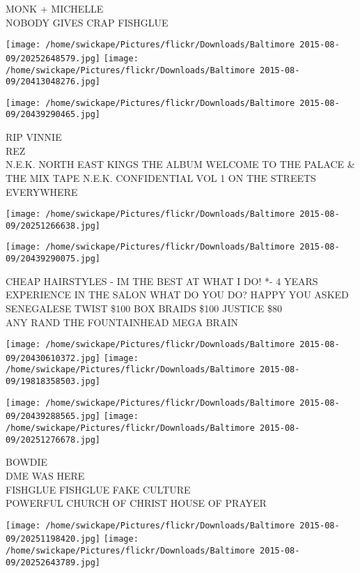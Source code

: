 \documentclass[10pt,letterpaper]{article}
\begin{document}
MONK + MICHELLE\\
NOBODY GIVES CRAP FISHGLUE\\
\pagebreak

\texttt{[image: /home/swickape/Pictures/flickr/Downloads/Baltimore 2015-08-09/20252648579.jpg]}
\texttt{[image: /home/swickape/Pictures/flickr/Downloads/Baltimore 2015-08-09/20413048276.jpg]}

\vspace{0.25in}
\texttt{[image: /home/swickape/Pictures/flickr/Downloads/Baltimore 2015-08-09/20439290465.jpg]}

RIP VINNIE\\
REZ\\
N.E.K. NORTH EAST KINGS THE ALBUM WELCOME TO THE PALACE \& THE MIX TAPE N.E.K. CONFIDENTIAL VOL 1 ON THE STREETS EVERYWHERE\\
\pagebreak

\texttt{[image: /home/swickape/Pictures/flickr/Downloads/Baltimore 2015-08-09/20251266638.jpg]}

\vspace{0.25in}
\texttt{[image: /home/swickape/Pictures/flickr/Downloads/Baltimore 2015-08-09/20439290075.jpg]}

CHEAP HAIRSTYLES {-} IM THE BEST AT WHAT I DO!  *{-} 4 YEARS EXPERIENCE IN THE SALON WHAT DO YOU DO?  HAPPY YOU ASKED SENEGALESE TWIST \$100 BOX BRAIDS \$100 JUSTICE \$80\\
ANY RAND THE FOUNTAINHEAD MEGA BRAIN\\
\pagebreak

\texttt{[image: /home/swickape/Pictures/flickr/Downloads/Baltimore 2015-08-09/20430610372.jpg]}
\texttt{[image: /home/swickape/Pictures/flickr/Downloads/Baltimore 2015-08-09/19818358503.jpg]}

\texttt{[image: /home/swickape/Pictures/flickr/Downloads/Baltimore 2015-08-09/20439288565.jpg]}
\texttt{[image: /home/swickape/Pictures/flickr/Downloads/Baltimore 2015-08-09/20251276678.jpg]}

BOWDIE\\
DME WAS HERE\\
FISHGLUE FISHGLUE FAKE CULTURE\\
POWERFUL CHURCH OF CHRIST HOUSE OF PRAYER\\
\pagebreak

\texttt{[image: /home/swickape/Pictures/flickr/Downloads/Baltimore 2015-08-09/20251198420.jpg]}
\texttt{[image: /home/swickape/Pictures/flickr/Downloads/Baltimore 2015-08-09/20252643789.jpg]}
\end{document}
